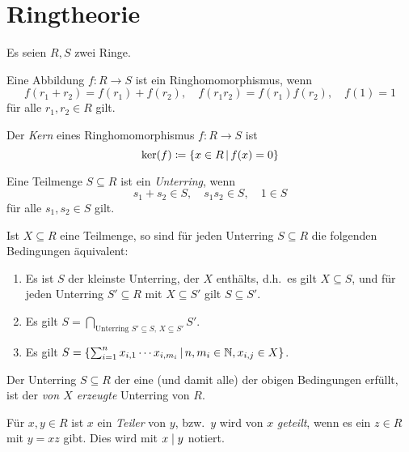 \chapter{Ringtheorie}

Es seien $R, S$ zwei Ringe.

\begin{definition}
  Eine Abbildung $f \colon R \to S$ ist ein Ringhomomorphismus, wenn
  \[
      f(r_1 + r_2)
    = f(r_1) + f(r_2),
    \quad
      f(r_1 r_2)
    = f(r_1) f(r_2),
    \quad
      f(1) = 1
  \]
  für alle $r_1, r_2 \in R$ gilt.
\end{definition}

\begin{definition}
  Der \emph{Kern} eines Ringhomomorphismus $f \colon R \to S$ ist
  \[
              \ker(f)
    \defined  \{x \in R \suchthat f(x) = 0\}
  \]
\end{definition}

\begin{definition}
  Eine Teilmenge $S \subseteq R$ ist ein \emph{Unterring}, wenn
  \[
    s_1 + s_2 \in S,
    \quad
    s_1 s_2 \in S,
    \quad
    1 \in S
  \]
  für alle $s_1, s_2 \in S$ gilt.
\end{definition}

Ist $X \subseteq R$ eine Teilmenge, so sind für jeden Unterring $S \subseteq R$ die folgenden Bedingungen äquivalent:

\begin{enumerate}
  \item
    Es ist $S$ der kleinste Unterring, der $X$ enthälts, d.h.\ es gilt $X \subseteq S$, und für jeden Unterring $S' \subseteq R$ mit $X \subseteq S'$ gilt $S \subseteq S'$.
  \item
    Es gilt $S = \bigcap_{\text{Unterring $S' \subseteq S$, $X \subseteq S'$}} S'$.
  \item
    Es gilt $S = \{ \sum_{i=1}^n x_{i,1} \dotsm x_{i,m_i} \suchthat n, m_i \in \Natural, x_{i,j} \in X \}$.
\end{enumerate}

\begin{definition}
  Der Unterring $S \subseteq R$ der eine \textup(und damit alle\textup) der obigen Bedingungen erfüllt, ist der \emph{von $X$ erzeugte} Unterring von $R$.
\end{definition}


\begin{definition}
  Für $x, y \in R$ ist $x$ ein \emph{Teiler} von $y$, bzw.\ $y$ wird von $x$ \emph{geteilt}, wenn es ein $z \in R$ mit $y = xz$ gibt.
  Dies wird mit $x \mathrel{|} y$ notiert.
\end{definition}





